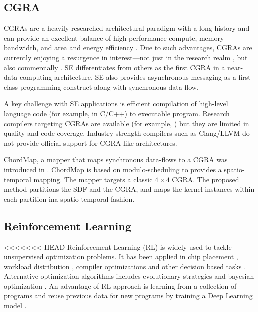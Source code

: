 \subsection{CGRA}
CGRAs are a heavily researched architectural paradigm with a long history and can provide an excellent balance of high-performance compute, memory bandwidth, and area and energy efficiency \cite{theodoridis2007survey}.
Due to such advantages, CGRAs are currently enjoying a resurgence in interest—not just in the research realm \cite{prabhakar2018plasticine}, but also commercially \cite{morgan2018intel, nicol2017coarse, vissers2019versal}.
SE differentiates from others as the first CGRA in a near-data computing architecture.
SE also provides asynchronous messaging as a first-class programming construct along with synchronous data flow. 

A key challenge with SE applications is efficient compilation of high-level language code (for example, in C/C++) to executable program. 
Research compilers targeting CGRAs are available (for example, \cite{adriaansen2016code, chin2017cgra, mei2003exploiting, prabhakar2018plasticine}) but they are limited in quality and code coverage. 
Industry-strength compilers such as Clang/LLVM do not provide official support for CGRA-like architectures.

ChordMap, a mapper that maps synchronous data-flows to a CGRA was introduced in \cite{li_chordmap_2022}.
ChordMap is based on modulo-scheduling to provides a spatio-temporal mapping.
The mapper targets a classic $4\times4$ CGRA.
The proposed method partitions the SDF and the CGRA, and maps the kernel instances within each partition ina spatio-temporal fashion.



\subsection{Reinforcement Learning}
<<<<<<< HEAD
Reinforcement Learning (RL) is widely used to tackle unsupervised optimization problems.
It has been applied in chip placement \cite{mirhoseini2020chip}, workload distribution \cite{Mirhoseini_placementRNN, addanki2019placeto, zhou2019gdp}, compiler optimizations \cite{Zhou_compileGNN} and other decision based tasks \cite{kormushev2013reinforcement, ZophL16_NASRL}. 
Alternative optimization algorithms includes evolutionary strategies \cite{Zhichao_ESNAS} and bayesian optimization \cite{shi2020learned}. 
An advantage of RL approach is learning from a collection of programs and reuse previous data for new programs by training a Deep Learning model \cite{zhou2019gdp}.

